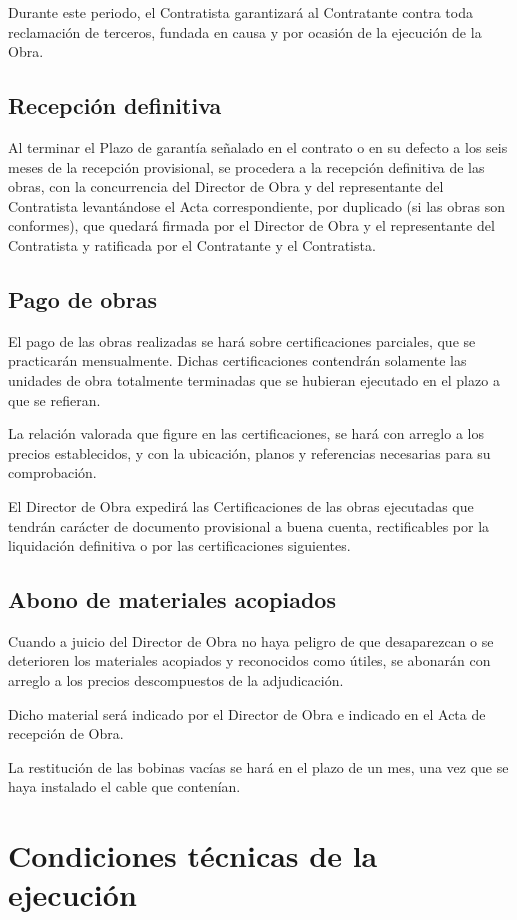 Durante  este periodo, el Contratista garantizará al Contratante contra toda  reclamación de terceros, fundada en causa y por ocasión de la ejecución de la Obra.
\subsection{Recepción definitiva}
\label{subsec:pliego-recepciondefOrg}
Al terminar el Plazo de garantía señalado en el contrato o en su defecto a los  seis meses de la recepción provisional, se procedera a la recepción definitiva  de las obras, con la concurrencia del Director de Obra y del representante del Contratista levantándose el Acta correspondiente, por duplicado (si las obras son conformes), que quedará firmada por el Director de Obra y el representante  del Contratista y ratificada por el Contratante y el Contratista.
\subsection{Pago de obras}
\label{subsec:pliego-pagoOrg}
El pago de las obras realizadas se hará sobre certificaciones parciales, que se practicarán mensualmente. Dichas certificaciones contendrán solamente las unidades de obra totalmente terminadas que se hubieran ejecutado en el plazo a que se refieran.  

La relación valorada que figure en las certificaciones, se hará con arreglo a los precios establecidos, y con la ubicación, planos y referencias necesarias para su comprobación.

El Director de Obra expedirá las Certificaciones de las obras ejecutadas que tendrán carácter de documento provisional a buena cuenta, rectificables por la  liquidación definitiva o por las certificaciones siguientes.
\subsection{Abono de materiales acopiados}
\label{subsec:pliego-abonomatOrg}
Cuando a juicio del Director de Obra no haya peligro de que desaparezcan o se  deterioren los materiales acopiados y reconocidos como útiles, se abonarán con arreglo a los precios descompuestos de la adjudicación. 

Dicho material será indicado por el Director de Obra e indicado en el Acta de recepción de Obra.  

La restitución de las bobinas vacías se hará en el plazo de un mes, una vez que  se haya instalado el cable que contenían.  
\section{Condiciones técnicas de la ejecución}
\label{sec:pliego-condiciones}
